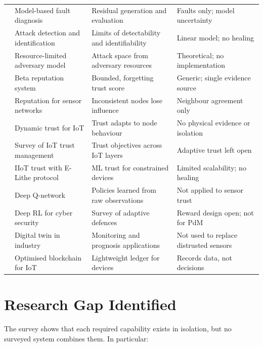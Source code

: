 {\begin{longtable}{@{}P{0.9cm} P{4.4cm} P{4.0cm} P{4.0cm}@{}}
\cite{isermann2005fdd} & Model-based fault diagnosis & Residual generation and evaluation & Faults only; model uncertainty \\
\cite{pasqualetti2013identification} & Attack detection and identification & Limits of detectability and identifiability & Linear model; no healing \\
\cite{teixeira2015secure} & Resource-limited adversary model & Attack space from adversary resources & Theoretical; no implementation \\
\cite{josang2002beta} & Beta reputation system & Bounded, forgetting trust score & Generic; single evidence source \\
\cite{ganeriwal2008reputation} & Reputation for sensor networks & Inconsistent nodes lose influence & Neighbour agreement only \\
\cite{bao2012dynamic} & Dynamic trust for IoT & Trust adapts to node behaviour & No physical evidence or isolation \\
\cite{yan2014trust} & Survey of IoT trust management & Trust objectives across IoT layers & Adaptive trust left open \\
\cite{motmi2022elithe} & IIoT trust with E-Lithe protocol & ML trust for constrained devices & Limited scalability; no healing \\
\cite{mnih2015dqn} & Deep Q-network & Policies learned from raw observations & Not applied to sensor trust \\
\cite{nguyen2023drl} & Deep RL for cyber security & Survey of adaptive defences & Reward design open; not for PdM \\
\cite{tao2019twin} & Digital twin in industry & Monitoring and prognosis applications & Not used to replace distrusted sensors \\
\cite{dorri2017optimized} & Optimised blockchain for IoT & Lightweight ledger for devices & Records data, not decisions \\
\end{longtable}
}

\section{Research Gap Identified}

The survey shows that each required capability exists in isolation, but no surveyed system combines them. In particular:

